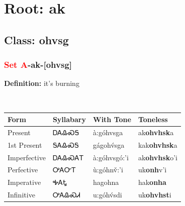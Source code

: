 \needspace{4in}
\section*{Root: ak}
\nopagebreak
{}
\needspace{3in}
\subsection*{Class: ohvsg}
\nopagebreak
\needspace{2in}
\subsubsection*{\textcolor{Red}{Set A}{-}\textbf{ak}{-}[ohvsg]}
\nopagebreak
\textbf{Definition: } it{\textquoteright}s burning
\\[0.5em]
\begin{tabularx}{\textwidth}{l X X X}%
\toprule%
\textbf{Form}&\textbf{Syllabary}&\textbf{With Tone}&\textbf{Toneless}\\%
\midrule%
Present&ᎠᎪᎲᏍᎦ&à:góhvsga&ak\textbf{ohvhsk}a\\%
1st Present&ᎦᎪᎲᏍᎦ&gágohv́sga&kak\textbf{ohvhsk}a\\%
Imperfective&ᎠᎪᎲᏍᎪᎢ&à:góhvsgó:’i&ak\textbf{ohvhsk}o'i\\%
Perfective&ᎤᎪᏅᎢ&ù:góhnv̌:’i&uk\textbf{onh}v'i\\%
Imperative&ᎭᎪᎿ&hagohna&hak\textbf{onha}\\%
Infinitive&ᎤᎪᎲᏍᏗ&u:góhv́sdi&uk\textbf{ohvhst}i\\%
\bottomrule%
\end{tabularx}
\\[1em]